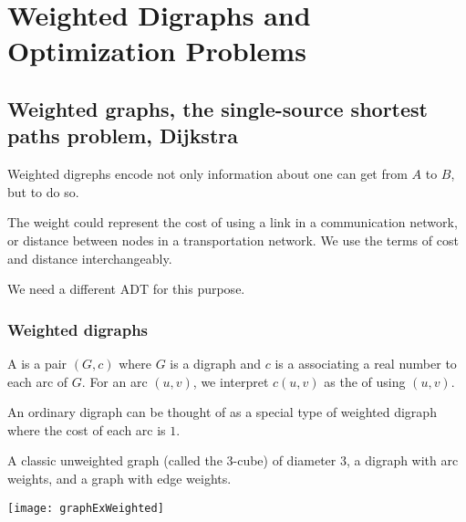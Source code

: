 \part{Weighted Digraphs and Optimization Problems}
\label{ch:weighted}


\chapter{Weighted graphs, the single-source shortest paths problem, Dijkstra} %

Weighted digrephs encode not only information about   one can get from $A$ to $B$, but
 to do so.

The weight could represent the cost of using a link
in a communication network, or distance between nodes in a
transportation network. We use the terms of cost and distance
interchangeably.

We need a different ADT for this purpose. 

\section{Weighted digraphs}
\label{sec:weighted}

\begin{Definition}
A  is a pair $(G, c)$ where $G$ is a digraph
and $c$ is a  associating a
real number to each arc of $G$. For an arc $(u,v)$, we interpret  $c(u, v)$ as the  of using $(u, v)$.
\end{Definition}

An ordinary digraph can be thought of as a special type of weighted digraph where the cost of each 
arc is $1$. 


\begin{Boxample}
\label{ex:graphExWeighted}
A classic unweighted graph
(called the $3$-cube) of diameter $3$, a digraph with arc weights, and a
graph with edge weights.
\begin{center}
\texttt{[image: graphExWeighted]}
\end{center}
\end{Boxample}

